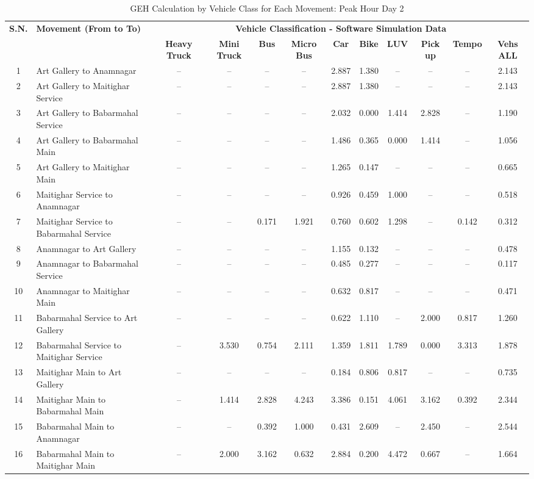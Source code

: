 \begin{landscape}
\begin{table}[h]
\centering
\caption{GEH Calculation by Vehicle Class for Each Movement: Peak Hour Day 2}
\small
\setlength{\tabcolsep}{5pt}

\begin{tabular}{|c|p{6cm}|c|c|c|c|c|c|c|c|c|c|}
\hline
\textbf{S.N.} & \textbf{Movement (From to To)} & \multicolumn{10}{c|}{\textbf{Vehicle Classification - Software Simulation Data}} \\
\cline{3-12}
& & \textbf{Heavy Truck} & \textbf{Mini Truck} & \textbf{Bus} & \textbf{Micro Bus} & \textbf{Car} & \textbf{Bike} & \textbf{LUV} & \textbf{Pick up} & \textbf{Tempo} & \textbf{Vehs ALL} \\
\hline
1 & Art Gallery to Anamnagar & -- & -- & -- & --  & 2.887 &	1.380	& -- &  -- & -- &2.143 \\
\hline
2 & Art Gallery to Maitighar Service & -- & -- & -- & -- & 2.887 & 1.380 & -- & -- & -- & 2.143 \\
\hline
3 & Art Gallery to Babarmahal Service & -- & -- & -- & -- & 2.032 & 0.000 & 1.414 & 2.828 & -- & 1.190 \\
\hline
4 & Art Gallery to Babarmahal Main & -- & -- & -- & -- & 1.486 & 0.365 & 0.000 & 1.414 & -- & 1.056 \\
\hline
5 & Art Gallery to Maitighar Main & -- & -- & -- & -- & 1.265 & 0.147 & -- & -- & -- & 0.665 \\
\hline
6 & Maitighar Service to Anamnagar & -- & -- & -- & -- & 0.926 & 0.459 & 1.000 & -- & -- & 0.518 \\
\hline
7 & Maitighar Service to Babarmahal Service & -- & -- & 0.171 & 1.921 & 0.760 & 0.602 & 1.298 & -- & 0.142 & 0.312 \\
\hline
8 & Anamnagar to Art Gallery & -- & -- & -- & -- & 1.155 & 0.132 & -- & -- & -- & 0.478 \\
\hline
9 & Anamnagar to Babarmahal Service & -- & -- & -- & -- & 0.485 & 0.277 & -- & -- & -- & 0.117 \\
\hline
10 & Anamnagar to Maitighar Main & -- & -- & -- & -- & 0.632 & 0.817 & -- & -- & -- & 0.471 \\
\hline
11 & Babarmahal Service to Art Gallery & -- & -- & -- & -- & 0.622 & 1.110 & -- & 2.000 & 0.817 & 1.260 \\
\hline
12 & Babarmahal Service to Maitighar Service & -- & 3.530 & 0.754 & 2.111 & 1.359 & 1.811 & 1.789 & 0.000 & 3.313 & 1.878 \\
\hline
13 & Maitighar Main to Art Gallery & -- & -- & -- & -- & 0.184 & 0.806 & 0.817 & -- & -- & 0.735 \\
\hline
14 & Maitighar Main to Babarmahal Main & -- & 1.414 & 2.828 & 4.243 & 3.386 & 0.151 & 4.061 & 3.162 & 0.392 & 2.344 \\
\hline
15 & Babarmahal Main to Anamnagar & -- & -- & 0.392 & 1.000 & 0.431 & 2.609 & -- & 2.450 & -- & 2.544 \\
\hline
16 & Babarmahal Main to Maitighar Main & -- & 2.000 & 3.162 & 0.632 & 2.884 & 0.200 & 4.472 & 0.667 & -- & 1.664 \\
\hline


\end{tabular}
\end{table}
\end{landscape}
